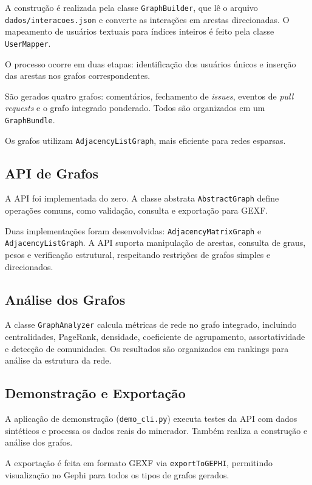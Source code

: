 \documentclass[12pt]{article}
\begin{document}
A construção é realizada pela classe \texttt{GraphBuilder}, que lê o arquivo \texttt{dados/interacoes.json} e converte as interações em arestas direcionadas. O mapeamento de usuários textuais para índices inteiros é feito pela classe \texttt{UserMapper}.

O processo ocorre em duas etapas: identificação dos usuários únicos e inserção das arestas nos grafos correspondentes.

São gerados quatro grafos: comentários, fechamento de \textit{issues}, eventos de \textit{pull requests} e o grafo integrado ponderado. Todos são organizados em um \texttt{GraphBundle}.

Os grafos utilizam \texttt{AdjacencyListGraph}, mais eficiente para redes esparsas.

\subsection{API de Grafos}

A API foi implementada do zero. A classe abstrata \texttt{AbstractGraph} define operações comuns, como validação, consulta e exportação para GEXF.

Duas implementações foram desenvolvidas: \texttt{AdjacencyMatrixGraph} e \texttt{AdjacencyListGraph}. A API suporta manipulação de arestas, consulta de graus, pesos e verificação estrutural, respeitando restrições de grafos simples e direcionados.

\subsection{Análise dos Grafos}

A classe \texttt{GraphAnalyzer} calcula métricas de rede no grafo integrado, incluindo centralidades, PageRank, densidade, coeficiente de agrupamento, assortatividade e detecção de comunidades. Os resultados são organizados em rankings para análise da estrutura da rede.

\subsection{Demonstração e Exportação}

A aplicação de demonstração (\texttt{demo\_cli.py}) executa testes da API com dados sintéticos e processa os dados reais do minerador. Também realiza a construção e análise dos grafos.

A exportação é feita em formato GEXF via \texttt{exportToGEPHI}, permitindo visualização no Gephi para todos os tipos de grafos gerados.
\end{document}
